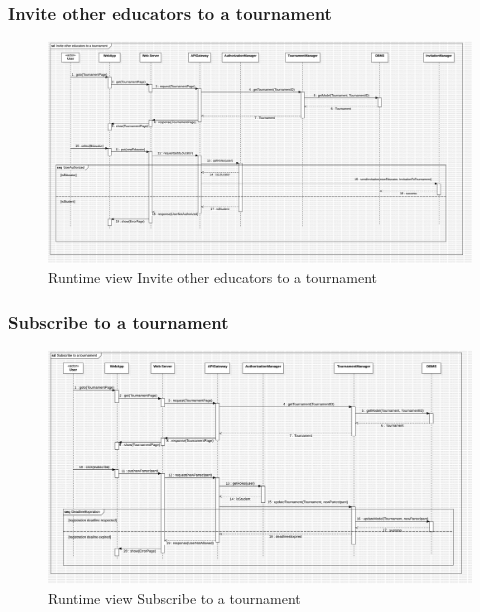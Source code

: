 \begin{itemize}
\subsubsection*{Invite other educators to a tournament}
\begin{figure}[H]
    \centering
    \includegraphics[width=\textwidth]{Diagrams/InviteEducatorSD.jpg}
    \caption{Runtime view Invite other educators to a tournament}
    \label{fig:runtime_view_invite_educator}
\end{figure}
\subsubsection*{Subscribe to a tournament}
\begin{figure}[H]
    \centering
    \includegraphics[width=\textwidth]{Diagrams/SubscribeTournamentSD.jpg}
    \caption{Runtime view Subscribe to a tournament}
    \label{fig:runtime_view_subscribe_tournament}
\end{figure}


\end{itemize}
